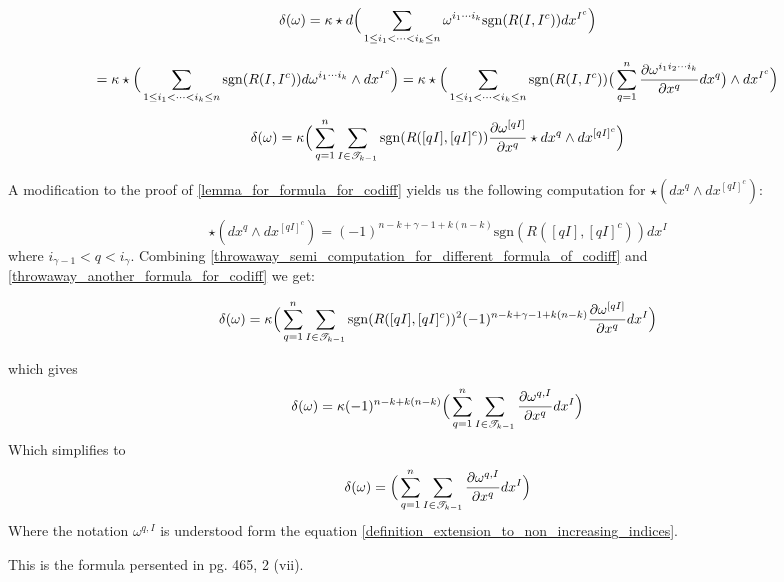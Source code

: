 $$\delta(\omega)=\kappa \star d \Big{(}\sum_{1\leq i_1<\cdots<i_k\leq n}\omega^{i_1\cdots i_k} \mathrm{sgn}(R(I,I^c))dx^{I^c}  \Big{)} $$ 

$$=\kappa \star \Big{(}\sum_{1\leq i_1<\cdots<i_k\leq n}\mathrm{sgn}(R(I,I^c))d\omega^{i_1\cdots i_k} \wedge dx^{I^c}  \Big{)}= \kappa \star \Big{(}\sum_{1\leq i_1<\cdots<i_k\leq n}\mathrm{sgn}(R(I,I^c))\big{(}\sum_{q=1}^n\frac{\partial \omega^{i_1i_2\cdots i_k}}{\partial x^q}dx^q\big{)} \wedge dx^{I^c}  \Big{)} $$

\begin{equation}\label{throwaway_another_formula_for_codiff}
\delta(\omega)=\kappa \Big{(}\sum_{q=1}^n\sum_{I\in \mathscr T_{k-1}}\mathrm{sgn}(R([qI],[qI]^c))\frac{\partial \omega^{[qI]}}{\partial x^q} \star dx^q \wedge dx^{[qI]^c} \Big{)} \end{equation}

A modification to the proof of \ref{lemma_for_formula_for_codiff} yields us the following computation for $\star (dx^q \wedge dx^{[qI]^c})$: 

\begin{equation}\label{throwaway_semi_computation_for_different_formula_of_codiff}
    \star(dx^q \wedge dx^{[qI]^c})=(-1)^{n-k+\gamma-1+k(n-k)}\mathrm{sgn}(R([qI],[qI]^c))dx^{I} 
\end{equation}
where $i_{\gamma-1}<q<i_{\gamma}$.
Combining \eqref{throwaway_semi_computation_for_different_formula_of_codiff} and \eqref{throwaway_another_formula_for_codiff} we get: 

$$
\delta(\omega)=\kappa \Big{(}\sum_{q=1}^n\sum_{I\in \mathscr T_{k-1}}\mathrm{sgn}(R([qI],[qI]^c))^2 (-1)^{n-k+\gamma-1+k(n-k)}\frac{\partial \omega^{[qI]}}{\partial x^q} dx^I \Big{)}$$

which gives
$$ \delta(\omega)=\kappa (-1)^{n-k+k(n-k)} \Big{(}\sum_{q=1}^n \sum_{I\in \mathscr T_{k-1}} \frac{\partial \omega^{q,I}}{\partial x^q}dx^I \Big{)}$$
Which simplifies to 
\begin{equation}
\delta(\omega)=\Big{(}\sum_{q=1}^n \sum_{I\in \mathscr T_{k-1}} \frac{\partial \omega^{q,I}}{\partial x^q}dx^I \Big{)}
\end{equation}
Where the notation $\omega^{q,I}$ is understood form the equation \ref{definition_extension_to_non_increasing_indices}.
\begin{remark}
    This is the formula persented in \cite{Csato_2018} pg. 465, 2 (vii).
\end{remark}

